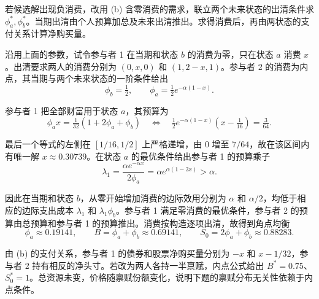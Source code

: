 \begin{solution}[blank-type=manual,blank-vsep=10\baselineskip]
\begin{enumerate}[label=(\alph*)]
 若候选解出现负消费，改用 (b) 含零消费的需求，联立两个未来状态的出清条件求 $\phi_a^*,\phi_b^*$。当期出清由个人预算加总及未来出清推出。求得消费后，再由两状态的支付关系计算净购买量。

沿用上面的参数，试令参与者 1 在当期和状态 $b$ 的消费为零，只在状态 $a$ 消费 $x$。出清要求两人的消费分别为 $(0,x,0)$ 和 $(1,2-x,1)$。参与者 2 的消费为内点，其当期与两个未来状态的一阶条件给出
\[
 \phi_b=\tfrac12,\qquad
 \phi_a=\tfrac12 e^{-\alpha(1-x)}.
\]

参与者 1 把全部财富用于状态 $a$，其预算为
\[
 \phi_a x=\tfrac1{32}(1+2\phi_a+\phi_b)
 \quad\Longleftrightarrow\quad
 \tfrac12 e^{-\alpha(1-x)}\left(x-\tfrac1{16}\right)=\tfrac3{64}.
\]

最后一个等式的左侧在 $[1/16,1/2]$ 上严格递增，由 $0$ 增至 $7/64$，故在该区间内有唯一解 $x\approx0.30739$。在状态 $a$ 的最优条件给出参与者 1 的预算乘子
\[
 \lambda_1=\frac{\alpha e^{-\alpha x}}{2\phi_a}
           =\alpha e^{\alpha(1-2x)}>\alpha.
\]

因此在当期和状态 $b$，从零开始增加消费的边际效用分别为 $\alpha$ 和 $\alpha/2$，均低于相应的边际支出成本 $\lambda_1$ 和 $\lambda_1\phi_b$。参与者 1 满足零消费的最优条件，参与者 2 的预算由总预算和参与者 1 的预算推出。消费按构造逐项出清，故得到角点均衡
\[
 \phi_a\approx0.19141,\qquad
 B=\phi_a+\phi_b\approx0.69141,\qquad
 S_0=2\phi_a+\phi_b\approx0.88283.
\]

由 (b) 的支付关系，参与者 1 的债券和股票净购买量分别为 $-x$ 和 $x-1/32$，参与者 2 持有相反的净头寸。若改为两人各持一半禀赋，内点公式给出 $B^*=0.75$、$S_0^*=1$。总资源未变，价格随禀赋份额变化，说明下题的禀赋分布无关性依赖于内点条件。
\end{enumerate}
\end{solution}

